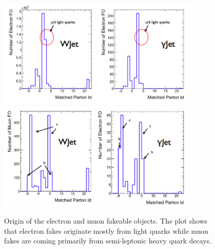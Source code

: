 \documentclass{cmspaper}
\begin{document}
\begin{figure}[!htbp]                                                                                         
\begin{center}                                                                                                
\includegraphics[width=0.9\textwidth]{figures/ElectronFakeOrigin.png}                                            
\includegraphics[width=0.9\textwidth]{figures/MuonFakeOrigin.png}\\                                           
\caption{ Origin of the electron and muon fakeable objects. The plot shows 
that electron fakes originate mostly from light quarks while muon fakes
are coming primarily from semi-leptonic heavy quark decays.}
\label{fig:fakeorigins}                                                                                          
\end{center}                                                                                                  
\end{figure}   
\end{document}
